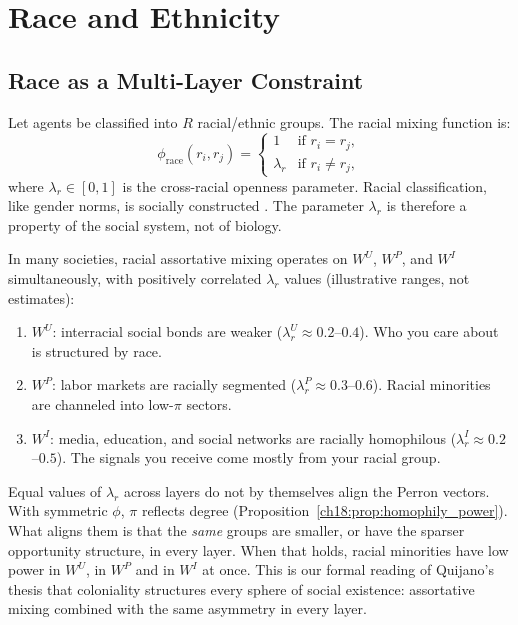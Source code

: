 \documentclass[../structural_economics_book.tex]{subfiles}
\begin{document}
\section{Race and Ethnicity}
\label{ch18:sec:race}

\subsection{Race as a Multi-Layer Constraint}

\begin{definition}\label{ch18:def:racial_mixing}
Let agents be classified into $R$ racial/ethnic groups. The racial mixing function is:
\begin{equation}\label{ch18:eq:racial_mixing}
\phi_{\text{race}}(r_i, r_j) = \begin{cases} 1 & \text{if } r_i = r_j, \\ \lambda_r & \text{if } r_i \neq r_j, \end{cases}
\end{equation}
where $\lambda_r \in [0, 1]$ is the cross-racial openness parameter. Racial classification, like gender norms, is socially constructed \citep{quijano2000colonialidad}. The parameter $\lambda_r$ is therefore a property of the social system, not of biology.
\end{definition}

\begin{conjecture}\label{ch18:prop:race_three}
In many societies, racial assortative mixing operates on $W^U$, $W^P$, and $W^I$ simultaneously, with positively correlated $\lambda_r$ values (illustrative ranges, not estimates):
\begin{enumerate}
\item $W^U$: interracial social bonds are weaker ($\lambda_r^U \approx 0.2$--$0.4$). Who you care about is structured by race.
\item $W^P$: labor markets are racially segmented ($\lambda_r^P \approx 0.3$--$0.6$). Racial minorities are channeled into low-$\pi$ sectors.
\item $W^I$: media, education, and social networks are racially homophilous ($\lambda_r^I \approx 0.2$--$0.5$). The signals you receive come mostly from your racial group.
\end{enumerate}

Equal values of $\lambda_r$ across layers do not by themselves align the Perron vectors. With symmetric $\phi$, $\pi$ reflects degree (Proposition~\ref{ch18:prop:homophily_power}). What aligns them is that the \emph{same} groups are smaller, or have the sparser opportunity structure, in every layer. When that holds, racial minorities have low power in $W^U$, in $W^P$ and in $W^I$ at once. This is our formal reading of Quijano's thesis that coloniality structures every sphere of social existence: assortative mixing combined with the same asymmetry in every layer.
\end{conjecture}
\end{document}

